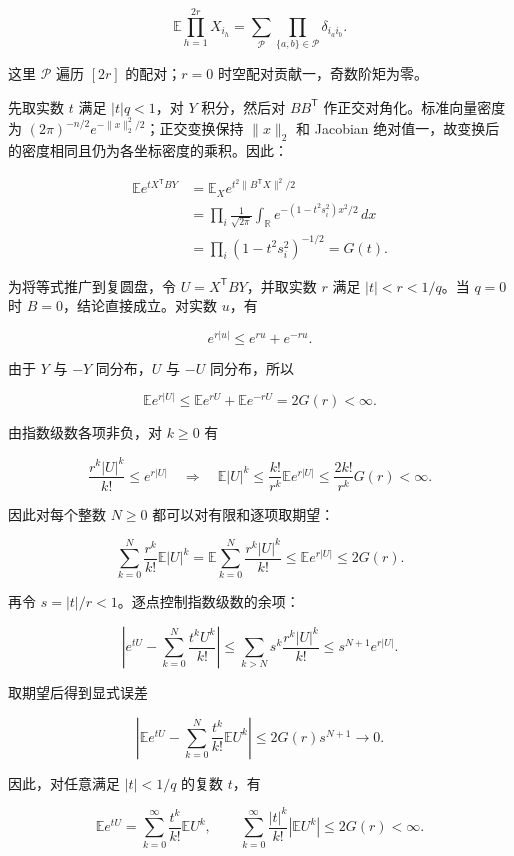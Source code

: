 \documentclass[11pt,a4paper]{article}
\begin{document}
\[\mathbb E\prod_{h=1}^{2r}X_{i_h}
=\sum_{\mathcal P}\prod_{\{a,b\}\in\mathcal P}\delta_{i_ai_b}.\]

这里 \(\mathcal P\) 遍历 \([2r]\) 的配对；\(r=0\) 时空配对贡献一，奇数阶矩为零。

先取实数 \(t\) 满足 \(|t|q<1\)，对 \(Y\) 积分，然后对 \(BB^{\mathsf T}\) 作正交对角化。标准向量密度为 \((2\pi)^{-n/2}e^{-\|x\|_2^2/2}\)；正交变换保持 \(\|x\|_2\) 和 Jacobian 绝对值一，故变换后的密度相同且仍为各坐标密度的乘积。因此：

\[\begin{aligned}
\mathbb Ee^{tX^{\mathsf T}BY}
&=\mathbb E_Xe^{t^2\|B^{\mathsf T}X\|^2/2}\\
&=\prod_i\frac1{\sqrt{2\pi}}\int_{\mathbb R}
e^{-(1-t^2s_i^2)x^2/2}\,dx\\
&=\prod_i(1-t^2s_i^2)^{-1/2}=G(t).
\end{aligned}\]

为将等式推广到复圆盘，令 \(U=X^{\mathsf T}BY\)，并取实数 \(r\) 满足 \(|t|<r<1/q\)。当 \(q=0\) 时 \(B=0\)，结论直接成立。对实数 \(u\)，有

\[e^{r|u|}\le e^{ru}+e^{-ru}.\]

由于 \(Y\) 与 \(-Y\) 同分布，\(U\) 与 \(-U\) 同分布，所以

\[\mathbb E e^{r|U|}
\le\mathbb E e^{rU}+\mathbb E e^{-rU}
=2G(r)<\infty.\]

由指数级数各项非负，对 \(k\ge0\) 有

\[\frac{r^k|U|^k}{k!}\le e^{r|U|}
\quad\Longrightarrow\quad
\mathbb E|U|^k\le\frac{k!}{r^k}\mathbb Ee^{r|U|}
\le\frac{2k!}{r^k}G(r)<\infty.\]

因此对每个整数 \(N\ge0\) 都可以对有限和逐项取期望：

\[\sum_{k=0}^{N}\frac{r^k}{k!}\mathbb E|U|^k
=\mathbb E\sum_{k=0}^{N}\frac{r^k|U|^k}{k!}
\le\mathbb Ee^{r|U|}\le2G(r).\]

再令 \(s=|t|/r<1\)。逐点控制指数级数的余项：

\[\left|e^{tU}-\sum_{k=0}^{N}\frac{t^kU^k}{k!}\right|
\le\sum_{k>N}s^k\frac{r^k|U|^k}{k!}
\le s^{N+1}e^{r|U|}.\]

取期望后得到显式误差

\[\left|\mathbb Ee^{tU}-\sum_{k=0}^{N}\frac{t^k}{k!}\mathbb EU^k\right|
\le2G(r)s^{N+1}\longrightarrow0.\]

因此，对任意满足 \(|t|<1/q\) 的复数 \(t\)，有

\[\mathbb E e^{tU}
=\sum_{k=0}^{\infty}\frac{t^k}{k!}\mathbb E U^k,
\qquad
\sum_{k=0}^{\infty}\frac{|t|^k}{k!}|\mathbb E U^k|
\le2G(r)<\infty.\]
\end{document}
